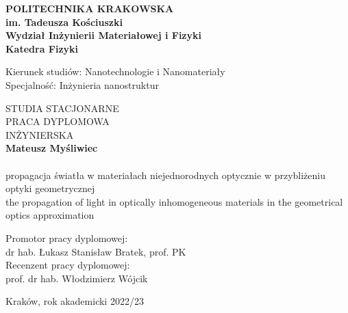 \begin{center}
{\large\bf POLITECHNIKA KRAKOWSKA \\ 
{\bf im. Tadeusza Kościuszki} \\ 
\medskip
Wydział Inżynierii Materiałowej i Fizyki}\\
\smallskip
{\large\bf Katedra Fizyki}
\end{center}
\vspace{1cm}
{\large Kierunek studiów: Nanotechnologie i Nanomateriały\\ Specjalność: Inżynieria nanostruktur}
\vspace{1cm}
\begin{center}
{\large STUDIA STACJONARNE}\\
\vspace{9mm}
{\Huge PRACA DYPLOMOWA}\\
INŻYNIERSKA\\
\bigskip\medskip
{\large\bf Mateusz Myśliwiec\\
}\\
\vspace{12mm}
{\sc\Large propagacja światła w materiałach niejednorodnych optycznie w przybliżeniu optyki geometrycznej\\
\vspace{5mm}
the propagation of light in optically inhomogeneous materials in the geometrical optics approximation}\\
\end{center}
\vspace{2.5cm}
\begin{flushright}
Promotor pracy dyplomowej:\\
dr hab. Łukasz Stanisław Bratek, prof. PK\\
\vspace{1.5cm}
Recenzent pracy dyplomowej:\\
prof. dr hab. Włodzimierz Wójcik
\end{flushright}
\vspace{1.7cm}
\begin{center}
{\large Kraków, rok akademicki 2022/23}
\end{center}




